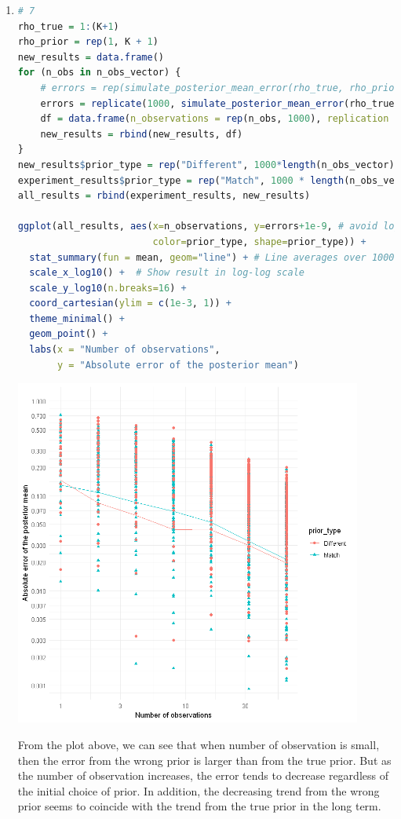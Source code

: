 \documentclass{article}
\begin{document}
\begin{enumerate}
\item 
\begin{lstlisting}[language=R]
# 7  
rho_true = 1:(K+1)
rho_prior = rep(1, K + 1)
new_results = data.frame()
for (n_obs in n_obs_vector) {
    # errors = rep(simulate_posterior_mean_error(rho_true, rho_prior, n_obs), 1000)
    errors = replicate(1000, simulate_posterior_mean_error(rho_true, rho_prior, n_obs))
    df = data.frame(n_observations = rep(n_obs, 1000), replication = (1:1000), errors = errors)
    new_results = rbind(new_results, df)
}
new_results$prior_type = rep("Different", 1000*length(n_obs_vector))
experiment_results$prior_type = rep("Match", 1000 * length(n_obs_vector))
all_results = rbind(experiment_results, new_results)

ggplot(all_results, aes(x=n_observations, y=errors+1e-9, # avoid log(0) 
                        color=prior_type, shape=prior_type)) + 
  stat_summary(fun = mean, geom="line") + # Line averages over 1000 replicates
  scale_x_log10() +  # Show result in log-log scale
  scale_y_log10(n.breaks=16) +
  coord_cartesian(ylim = c(1e-3, 1)) +
  theme_minimal() +
  geom_point() +
  labs(x = "Number of observations",
       y = "Absolute error of the posterior mean")
\end{lstlisting}

\includegraphics[width=0.9\textwidth]{two_errors.png}

From the plot above, we can see that when number of observation is small, then the error from the wrong prior is larger than from the true prior.
But as the number of observation increases, the error tends to decrease regardless of the initial choice of prior. In addition, the decreasing trend from the wrong prior seems to coincide with the trend from the true prior in the long term.




\end{enumerate}










 
\end{document}
